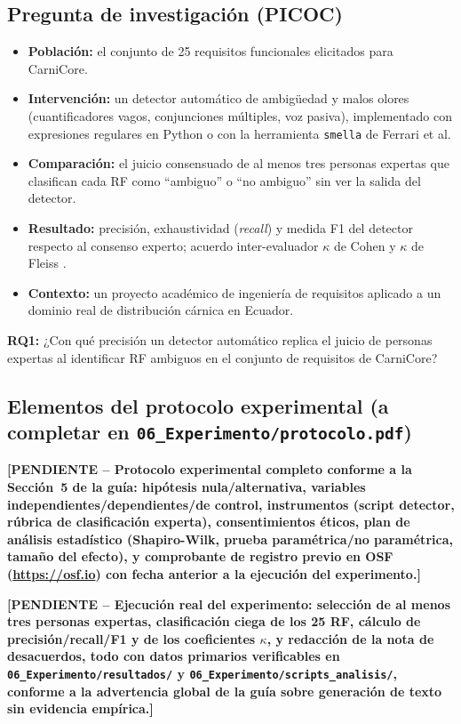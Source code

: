 \documentclass[11pt,a4paper]{article}
\newcommand{\PENDIENTE}[1]{\textcolor{pendiente}{\textbf{[PENDIENTE -- #1]}}}
\begin{document}
\subsection{Pregunta de investigación (PICOC)}
\begin{itemize}[nosep]
\item \textbf{Población:} el conjunto de 25 requisitos funcionales elicitados para CarniCore.
\item \textbf{Intervención:} un detector automático de ambigüedad y malos olores (cuantificadores vagos, conjunciones múltiples, voz pasiva), implementado con expresiones regulares en Python o con la herramienta \texttt{smella} de Ferrari et al.
\item \textbf{Comparación:} el juicio consensuado de al menos tres personas expertas que clasifican cada RF como ``ambiguo'' o ``no ambiguo'' sin ver la salida del detector.
\item \textbf{Resultado:} precisión, exhaustividad (\textit{recall}) y medida F1 del detector respecto al consenso experto; acuerdo inter-evaluador $\kappa$ de Cohen \cite{cohen1960kappa} y $\kappa$ de Fleiss \cite{fleiss1971kappa}.
\item \textbf{Contexto:} un proyecto académico de ingeniería de requisitos aplicado a un dominio real de distribución cárnica en Ecuador.
\end{itemize}

\textbf{RQ1:} ¿Con qué precisión un detector automático replica el juicio de personas expertas al identificar RF ambiguos en el conjunto de requisitos de CarniCore?

\subsection{Elementos del protocolo experimental (a completar en \texttt{06\_Experimento/protocolo.pdf})}
\PENDIENTE{Protocolo experimental completo conforme a la Sección~5 de la guía: hipótesis nula/alternativa, variables independientes/dependientes/de control, instrumentos (script detector, rúbrica de clasificación experta), consentimientos éticos, plan de análisis estadístico (Shapiro-Wilk, prueba paramétrica/no paramétrica, tamaño del efecto), y comprobante de registro previo en OSF (\url{https://osf.io}) con fecha anterior a la ejecución del experimento.}

\PENDIENTE{Ejecución real del experimento: selección de al menos tres personas expertas, clasificación ciega de los 25 RF, cálculo de precisión/recall/F1 y de los coeficientes $\kappa$, y redacción de la nota de desacuerdos, todo con datos primarios verificables en \texttt{06\_Experimento/resultados/} y \texttt{06\_Experimento/scripts\_analisis/}, conforme a la advertencia global de la guía sobre generación de texto sin evidencia empírica.}
\end{document}
